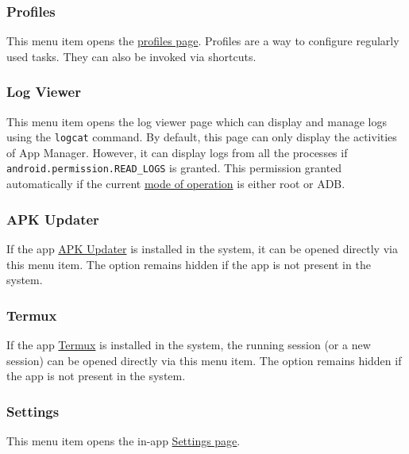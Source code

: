 \subsubsection{Profiles} %
This menu item opens the \hyperref[sec:profiles-page]{profiles page}. Profiles are a way to configure regularly used
tasks. They can also be invoked via shortcuts.

\subsubsection{Log Viewer}\label{subsubsec:log-viewer} %
This menu item opens the log viewer page which can display and manage logs using the \texttt{logcat} command. By
default, this page can only display the activities of App Manager. However, it can display logs from all the
processes if \texttt{android.permission.READ\_LOGS} is granted. This permission granted automatically if the current
\hyperref[subsec:mode-of-operation]{mode of operation} is either root or ADB.

\subsubsection{APK Updater} %
If the app \href{https://github.com/rumboalla/apkupdater}{APK Updater} is installed in the system, it can be opened
directly via this menu item. The option remains hidden if the app is not present in the system.

\subsubsection{Termux} %
If the app \href{https://github.com/termux/termux-app}{Termux} is installed in the system, the running session (or a
new session) can be opened directly via this menu item. The option remains hidden if the app is not present in the
system.

\subsubsection{Settings} %
This menu item opens the in-app \hyperref[sec:settings-page]{Settings page}.
